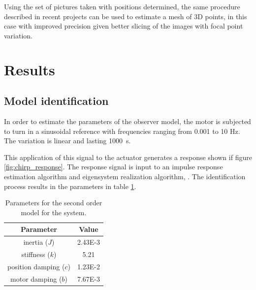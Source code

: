 \documentclass[journal]{IEEEtran}
\begin{document}
Using the set of pictures taken with positions determined, the same procedure described in recent projects can be used to estimate a mesh of 3D points, in this case with improved precision given better slicing of the images with focal point variation.


\section{Results}

\subsection{Model identification}

In order to estimate the parameters of the observer model, the motor is subjected to turn in a sinusoidal reference with frequencies ranging from 0.001 to 10 Hz. The variation is linear and lasting 1000~s.

This application of this signal to the actuator generates a response shown if figure \ref{fig:chirp_response}. The response signal is input to an impulse response estimation algorithm and eigensystem realization algorithm, \cite{Ljung1999}. The identification process results in the parameters in table \ref{tab:model_parameters}.

\begin{table}[!t]
\renewcommand{\arraystretch}{1.3}
\caption{Parameters for the second order model for the system.}
\label{tab:model_parameters}
\centering
\begin{tabular}{|c||c|}
\hline
Parameter & Value\\
\hline
inertia ($J$) & 2.43E-3 \\
stiffness ($k$) & 5.21 \\
position damping ($c$) & 1.23E-2 \\
motor damping ($b$) & 7.67E-3\\
\hline
\end{tabular}
\end{table}
\end{document}
